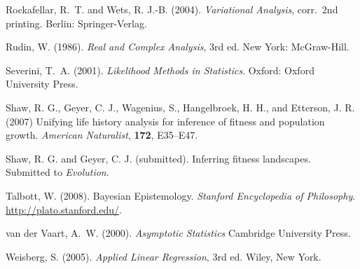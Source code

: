 \documentclass[11pt]{article}
\begin{document}
\begin{thebibliography}{}
Rockafellar, R.~T. and Wets, R. J.-B. (2004).
\newblock \emph{Variational Analysis}, corr.\ 2nd printing.
\newblock Berlin: Springer-Verlag.

Rudin, W. (1986).
\newblock \emph{Real and Complex Analysis}, 3rd ed.
\newblock New York: McGraw-Hill.

Severini, T.~A. (2001).
\newblock \emph{Likelihood Methods in Statistics}.
\newblock Oxford: Oxford University Press.

Shaw, R. G., Geyer, C. J., Wagenius, S., Hangelbroek, H. H., and
    Etterson, J. R. (2007)
\newblock Unifying life history analysis for inference of fitness
    and population growth.
\newblock \emph{American Naturalist}, \textbf{172}, E35--E47.

Shaw, R. G. and Geyer, C. J. (submitted).
\newblock Inferring fitness landscapes.
\newblock Submitted to \emph{Evolution}.

Talbott, W. (2008).
\newblock Bayesian Epistemology.
\newblock \emph{Stanford Encyclopedia of Philosophy}.
\newblock \url{http://plato.stanford.edu/}.

van der Vaart, A.~W. (2000).
\newblock \emph{Asymptotic Statistics}
\newblock Cambridge University Press.

Weisberg, S. (2005).
\newblock \emph{Applied Linear Regression}, 3rd ed.
\newblock Wiley, New York.

\end{thebibliography}
\end{document}
